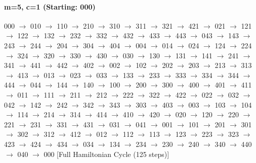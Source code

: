 \paragraph{ m=5, c=1 (Starting: 000)}



000 $\rightarrow$ 010 $\rightarrow$ 110 $\rightarrow$ 210 $\rightarrow$ 310 $\rightarrow$ 311 $\rightarrow$ 321 $\rightarrow$ 421 $\rightarrow$ 021 $\rightarrow$ 121 $\rightarrow$ 122 $\rightarrow$ 132 $\rightarrow$ 232 $\rightarrow$ 332 $\rightarrow$ 432 $\rightarrow$ 433 $\rightarrow$ 443 $\rightarrow$ 043 $\rightarrow$ 143 $\rightarrow$ 243 $\rightarrow$ 244 $\rightarrow$ 204 $\rightarrow$ 304 $\rightarrow$ 404 $\rightarrow$ 004 $\rightarrow$ 014 $\rightarrow$ 024 $\rightarrow$ 124 $\rightarrow$ 224 $\rightarrow$ 324 $\rightarrow$ 320 $\rightarrow$ 330 $\rightarrow$ 430 $\rightarrow$ 030 $\rightarrow$ 130 $\rightarrow$ 131 $\rightarrow$ 141 $\rightarrow$ 241 $\rightarrow$ 341 $\rightarrow$ 441 $\rightarrow$ 442 $\rightarrow$ 402 $\rightarrow$ 002 $\rightarrow$ 102 $\rightarrow$ 202 $\rightarrow$ 203 $\rightarrow$ 213 $\rightarrow$ 313 $\rightarrow$ 413 $\rightarrow$ 013 $\rightarrow$ 023 $\rightarrow$ 033 $\rightarrow$ 133 $\rightarrow$ 233 $\rightarrow$ 333 $\rightarrow$ 334 $\rightarrow$ 344 $\rightarrow$ 444 $\rightarrow$ 044 $\rightarrow$ 144 $\rightarrow$ 140 $\rightarrow$ 100 $\rightarrow$ 200 $\rightarrow$ 300 $\rightarrow$ 400 $\rightarrow$ 401 $\rightarrow$ 411 $\rightarrow$ 011 $\rightarrow$ 111 $\rightarrow$ 211 $\rightarrow$ 212 $\rightarrow$ 222 $\rightarrow$ 322 $\rightarrow$ 422 $\rightarrow$ 022 $\rightarrow$ 032 $\rightarrow$ 042 $\rightarrow$ 142 $\rightarrow$ 242 $\rightarrow$ 342 $\rightarrow$ 343 $\rightarrow$ 303 $\rightarrow$ 403 $\rightarrow$ 003 $\rightarrow$ 103 $\rightarrow$ 104 $\rightarrow$ 114 $\rightarrow$ 214 $\rightarrow$ 314 $\rightarrow$ 414 $\rightarrow$ 410 $\rightarrow$ 420 $\rightarrow$ 020 $\rightarrow$ 120 $\rightarrow$ 220 $\rightarrow$ 221 $\rightarrow$ 231 $\rightarrow$ 331 $\rightarrow$ 431 $\rightarrow$ 031 $\rightarrow$ 041 $\rightarrow$ 001 $\rightarrow$ 101 $\rightarrow$ 201 $\rightarrow$ 301 $\rightarrow$ 302 $\rightarrow$ 312 $\rightarrow$ 412 $\rightarrow$ 012 $\rightarrow$ 112 $\rightarrow$ 113 $\rightarrow$ 123 $\rightarrow$ 223 $\rightarrow$ 323 $\rightarrow$ 423 $\rightarrow$ 424 $\rightarrow$ 434 $\rightarrow$ 034 $\rightarrow$ 134 $\rightarrow$ 234 $\rightarrow$ 230 $\rightarrow$ 240 $\rightarrow$ 340 $\rightarrow$ 440 $\rightarrow$ 040 $\rightarrow$ 000 
[Full Hamiltonian Cycle (125 steps)]


